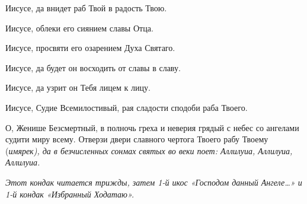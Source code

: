 Иисусе, да внидет раб Твой в радость Твою. 

Иисусе, облеки его сиянием славы Отца. 

Иисусе, просвяти его озарением Духа Святаго. 

Иисусе, да будет он восходить от славы в славу. 

Иисусе, да узрит он Тебя лицем к лицу. 

Иисусе, Судие Всемилостивый, рая сладости сподоби раба Твоего.




О, Женише Безсмертный, в полночь греха и неверия грядый с небес со ангелами судити миру всему. Отверзи двери славного чертога Твоего рабу Твоему (\itshape имярек\normalfont{}), да в безчисленных сонмах святых во веки поет: Аллилуиа, Аллилуиа, Аллилуиа. 

\itshape Этот кондак читается трижды, затем 1-й икос «Господом данный Ангеле…» и 1-й кондак «Избранный Ходатаю».\normalfont{}
\mychapterending

 


